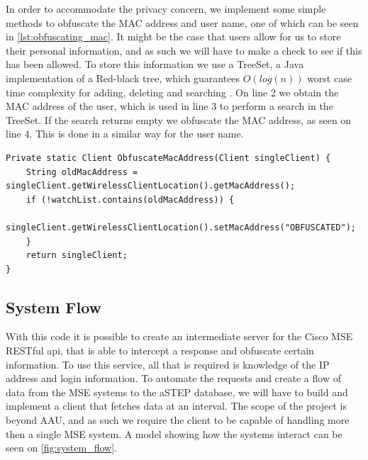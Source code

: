 In order to accommodate the privacy concern, we implement some simple methods to obfuscate the MAC address and user name, one of which can be seen in \cref{lst:obfuscating_mac}. It might be the case that users allow for us to store their personal information, and as such we will have to make a check to see if this has been allowed. To store this information we use a TreeSet, a Java implementation of a Red-black tree, which guarantees $O(log(n))$ worst case time complexity for adding, deleting and searching \cite{aa_book}\cite{treeset}. On line 2 we obtain the MAC address of the user, which is used in line 3 to perform a search in the TreeSet. If the search returns empty we obfuscate the MAC address, as seen on line 4. This is done in a similar way for the user name.

\begin{lstlisting}[caption={Obfuscating MAC address},label={lst:obfuscating_mac},language=inc_Java]
Private static Client ObfuscateMacAddress(Client singleClient) {
    String oldMacAddress = singleClient.getWirelessClientLocation().getMacAddress();
    if (!watchList.contains(oldMacAddress)) {
        singleClient.getWirelessClientLocation().setMacAddress("OBFUSCATED");
    }
    return singleClient;
}
\end{lstlisting}

\subsection*{System Flow}\label{subsec:system_hierarchy}
With this code it is possible to create an intermediate server for the Cisco MSE RESTful api, that is able to intercept a response and obfuscate certain information. To use this service, all that is required is knowledge of the IP address and login information. To automate the requests and create a flow of data from the MSE systems to the aSTEP database, we will have to build and implement a client that fetches data at an interval. The scope of the project is beyond AAU, and as such we require the client to be capable of handling more then a single MSE system. A model showing how the systems interact can be seen on \cref{fig:system_flow}.

